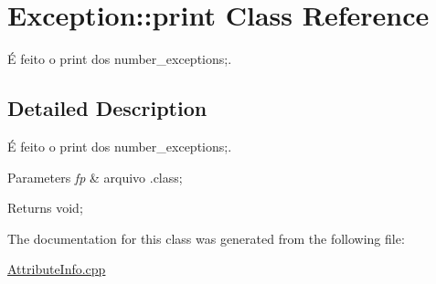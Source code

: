 \hypertarget{class_exception_1_1print}{}\section{Exception\+:\+:print Class Reference}
\label{class_exception_1_1print}


É feito o print dos number\+\_\+exceptions;.  




\subsection{Detailed Description}
É feito o print dos number\+\_\+exceptions;. 


\begin{DoxyParams}{Parameters}
{\em fp} & arquivo .class; \\
\hline
\end{DoxyParams}
\begin{DoxyReturn}{Returns}
void; 
\end{DoxyReturn}


The documentation for this class was generated from the following file\+:\begin{DoxyCompactItemize}
\item 
\hyperlink{_attribute_info_8cpp}{Attribute\+Info.\+cpp}\end{DoxyCompactItemize}
